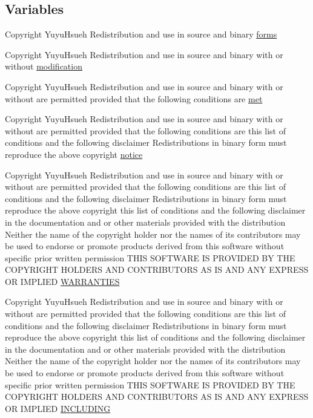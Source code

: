 \subsection*{Variables}
\begin{DoxyCompactItemize}
\item 
Copyright Yuyu\+Hsueh Redistribution and use in source and binary \hyperlink{license_8txt_a907462b7b3ae0a9072f23e05f66fb7f1}{forms}
\item 
Copyright Yuyu\+Hsueh Redistribution and use in source and binary with or without \hyperlink{license_8txt_ad26192e5b2b1fdec8883d2c0110e35c6}{modification}
\item 
Copyright Yuyu\+Hsueh Redistribution and use in source and binary with or without are permitted provided that the following conditions are \hyperlink{license_8txt_ac8582a50364a60dd4d7d7d24f725c413}{met}
\item 
Copyright Yuyu\+Hsueh Redistribution and use in source and binary with or without are permitted provided that the following conditions are this list of conditions and the following disclaimer Redistributions in binary form must reproduce the above copyright \hyperlink{license_8txt_af4bbea5cb99610e4ef2a43c12b41e9c9}{notice}
\item 
Copyright Yuyu\+Hsueh Redistribution and use in source and binary with or without are permitted provided that the following conditions are this list of conditions and the following disclaimer Redistributions in binary form must reproduce the above copyright this list of conditions and the following disclaimer in the documentation and or other materials provided with the distribution Neither the name of the copyright holder nor the names of its contributors may be used to endorse or promote products derived from this software without specific prior written permission T\+H\+IS S\+O\+F\+T\+W\+A\+RE IS P\+R\+O\+V\+I\+D\+ED BY T\+HE C\+O\+P\+Y\+R\+I\+G\+HT H\+O\+L\+D\+E\+RS A\+ND C\+O\+N\+T\+R\+I\+B\+U\+T\+O\+RS AS IS A\+ND A\+NY E\+X\+P\+R\+E\+SS OR I\+M\+P\+L\+I\+ED \hyperlink{license_8txt_a042eb66328050ad88743187ae8e43b95}{W\+A\+R\+R\+A\+N\+T\+I\+ES}
\item 
Copyright Yuyu\+Hsueh Redistribution and use in source and binary with or without are permitted provided that the following conditions are this list of conditions and the following disclaimer Redistributions in binary form must reproduce the above copyright this list of conditions and the following disclaimer in the documentation and or other materials provided with the distribution Neither the name of the copyright holder nor the names of its contributors may be used to endorse or promote products derived from this software without specific prior written permission T\+H\+IS S\+O\+F\+T\+W\+A\+RE IS P\+R\+O\+V\+I\+D\+ED BY T\+HE C\+O\+P\+Y\+R\+I\+G\+HT H\+O\+L\+D\+E\+RS A\+ND C\+O\+N\+T\+R\+I\+B\+U\+T\+O\+RS AS IS A\+ND A\+NY E\+X\+P\+R\+E\+SS OR I\+M\+P\+L\+I\+ED \hyperlink{license_8txt_ac6699313e23a90e93d8db75154e2e689}{I\+N\+C\+L\+U\+D\+I\+NG}

\end{DoxyCompactItemize}
